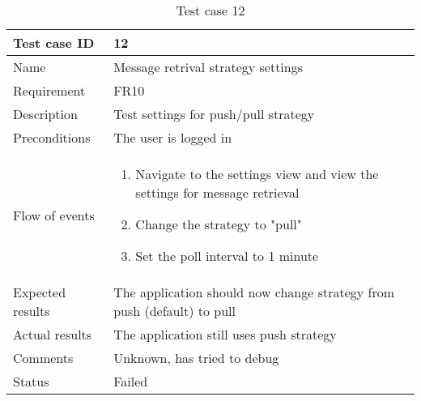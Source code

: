 		\begin{table}[htb]
			\begin{tabular}{l|p{10cm}}
				Test case ID & 12\\ \hline
				Name & Message retrival strategy settings\\ \hline
				Requirement & FR10\\ \hline
				Description & Test settings for push/pull strategy\\ \hline
				Preconditions & The user is logged in\\ \hline
				Flow of events & 
					\begin{enumerate}
						\item{}Navigate to the settings view and view the settings for message retrieval
						\item{}Change the strategy to "pull"
						\item{}Set the poll interval to 1 minute
					\end{enumerate} \\ \hline
				Expected results & The application should now change strategy from push (default) to pull \\ \hline
				Actual results & The application still uses push strategy\\ \hline
				Comments & Unknown, has tried to debug\\ \hline
				Status & Failed\\ \hline
			\end{tabular}
			\caption{Test case 12} \label{tab:case12}
		\end{table}

